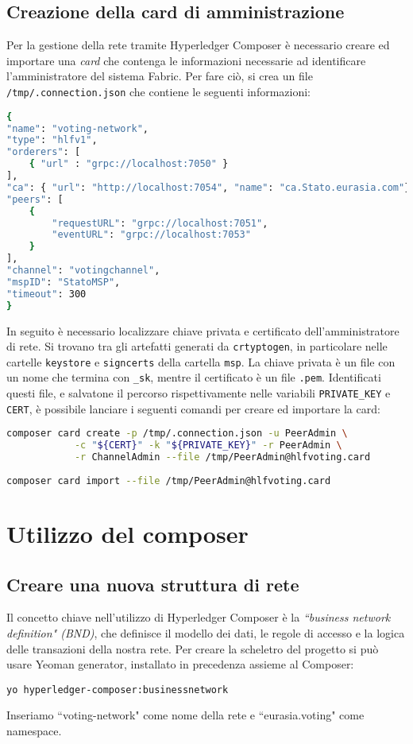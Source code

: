 	\subsection{Creazione della card di amministrazione}
		Per la gestione della rete tramite Hyperledger Composer è necessario creare ed importare una \emph{card} che contenga le informazioni necessarie ad identificare l'amministratore del sistema Fabric. Per fare ciò, si crea un file \lstinline{/tmp/.connection.json} che contiene le seguenti informazioni:
\begin{lstlisting}[language=bash]
{
"name": "voting-network",
"type": "hlfv1",
"orderers": [
	{ "url" : "grpc://localhost:7050" }
],
"ca": { "url": "http://localhost:7054", "name": "ca.Stato.eurasia.com"},
"peers": [
	{
		"requestURL": "grpc://localhost:7051",
		"eventURL": "grpc://localhost:7053"
	}
],
"channel": "votingchannel",
"mspID": "StatoMSP",
"timeout": 300
}

\end{lstlisting}

		In seguito è necessario localizzare chiave privata e certificato dell'amministratore di rete. Si trovano tra gli artefatti generati da \lstinline{crtyptogen}, in particolare nelle cartelle \lstinline{keystore} e \lstinline{signcerts} della cartella \lstinline{msp}. La chiave privata è un file con un nome che termina con \lstinline{_sk}, mentre il certificato è un file \lstinline{.pem}. Identificati questi file, e salvatone il percorso rispettivamente nelle variabili \lstinline{PRIVATE_KEY} e \lstinline{CERT}, è possibile lanciare i seguenti comandi per creare ed importare la card:
		
\begin{lstlisting}[language=bash]
composer card create -p /tmp/.connection.json -u PeerAdmin \
			-c "${CERT}" -k "${PRIVATE_KEY}" -r PeerAdmin \
			-r ChannelAdmin --file /tmp/PeerAdmin@hlfvoting.card
			
composer card import --file /tmp/PeerAdmin@hlfvoting.card

\end{lstlisting}

\section{Utilizzo del composer}
	\subsection{Creare una nuova struttura di rete}
		Il concetto chiave nell'utilizzo di Hyperledger Composer è la \emph{``business network definition" (BND)}, che definisce il modello dei dati, le regole di accesso e la logica delle transazioni della nostra rete. Per creare la scheletro del progetto si può usare Yeoman generator, installato in precedenza assieme al Composer:
\begin{lstlisting}
yo hyperledger-composer:businessnetwork
\end{lstlisting}
		Inseriamo ``voting-network" come nome della rete e ``eurasia.voting" come namespace.
